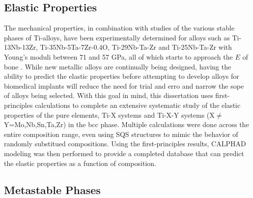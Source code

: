 \subsection{Elastic Properties}

The mechanical properties, in combination with studies of the various stable phases of Ti-alloys, have been experimentally determined for alloys such as Ti-13Nb-13Zr, Ti-35Nb-5Ta-7Zr-0.4O, Ti-29Nb-Ta-Zr and Ti-25Nb-Ta-Zr with Young's moduli between 71 and 57 GPa, all of which starts to approach the $E$ of bone \cite{Long1998a,Tane2008a,Tane2010a}. While new metallic alloys are continually being designed, having the ability to predict the elastic properties before attempting to develop alloys for biomedical implants will reduce the need for trial and erro and narrow the sope of alloys being selected. With this goal in mind, this dissertation uses first-principles calculations to complete an extensive systematic study of the elastic properties of the pure elements, Ti-X systems and Ti-X-Y systems (X$\neq$Y=Mo,Nb,Sn,Ta,Zr) in the bcc phase. Multiple calculations were done across the entire composition range, even using SQS structures to mimic the behavior of randomly substitued compositions. Using the first-principles results, CALPHAD modeling was then performed to provide a completed database that can predict the elastic properties as a function of composition.

\subsection{Metastable Phases}

